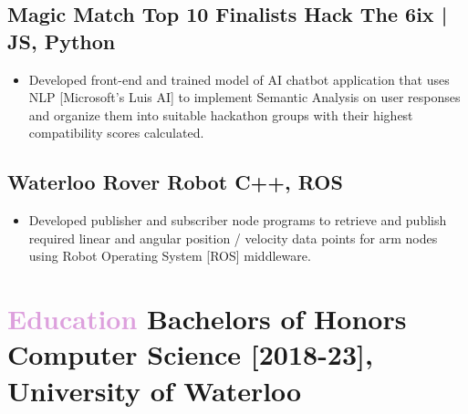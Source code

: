 \documentclass{article}
\begin{document}
		\subsection*{Magic Match {\small {\color{Plum} Top 10 Finalists Hack The 6ix | JS, Python}}}
			\begin{itemize}[label={\color{Plum} \faCaretRight}]
			\itemsep0em
			\item Developed front-end and trained model of AI chatbot application that uses NLP [Microsoft's Luis AI] to implement Semantic Analysis on user responses and organize them into suitable hackathon groups with their highest compatibility scores calculated. 
			\end{itemize} 
		\subsection*{Waterloo Rover Robot {\small {\color{Plum} C++, ROS}}} 
			\begin{itemize}[label={\color{Plum} \faCaretRight}]
			\item Developed publisher and subscriber node programs to retrieve and publish required linear and angular position / velocity data points for arm nodes using Robot Operating System [ROS] middleware. 
			\end{itemize}

\iffalse 
\section*{\Large {\textcolor{Plum} {Relevant Courses}}} 
			\begin{itemize}[label={\color{Plum} \faCaretRight}]
			\itemsep0em
			\item CS 246 - Object Oriented Programming {\small {\color{Plum} 83\%}}
			\item CS 136 - Elementary Algorithm Design and Data Abstraction {\small {\color{Plum} 82\%}}
			\item MATH 235 - Linear Algebra 2 {\small {\color{Plum} 87\%}}
			\item STAT 230 - Probability {\small {\color{Plum} 81\%}}
			\end{itemize}
\fi


\section*  {\Large  \faGraduationCap {\hspace{0.5em}} {\textcolor{Plum} {Education}} \hfill {\normalsize Bachelors of Honors Computer Science [2018-23], University of Waterloo }}
\end{document}
